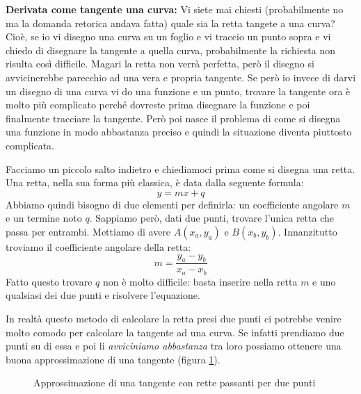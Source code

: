\textbf{Derivata come tangente una curva:} Vi siete mai chiesti (probabilmente no ma la domanda retorica andava fatta) quale sia la retta tangete a una curva? Cioè, se io vi disegno una curva su un foglio e vi traccio un punto sopra e vi chiedo di disegnare la tangente a quella curva, probabilmente la richiesta non risulta così difficile. Magari la retta non verrà perfetta, però il disegno si avvicinerebbe parecchio ad una vera e propria tangente. Se però io invece di darvi un disegno di una curva vi do una funzione e un punto, trovare la tangente ora è molto più complicato perché dovreste prima disegnare la funzione e poi finalmente tracciare la tangente. Però poi nasce il problema di come si disegna una funzione in modo abbastanza preciso e quindi la situazione diventa piuttosto complicata. 

Facciamo un piccolo salto indietro e chiediamoci prima come si disegna una retta. Una retta, nella sua forma più classica, è data dalla seguente formula:
\begin{equation*}
	y = mx + q
\end{equation*}
Abbiamo quindi bisogno di due elementi per definirla: un coefficiente angolare $m$ e un termine noto $q$. Sappiamo però, dati due punti, trovare l'unica retta che passa per entrambi. Mettiamo di avere $A(x_a, y_a)$ e $B(x_b, y_b)$. Innanzitutto troviamo il coefficiente angolare della retta:
\begin{equation*}
	m = \dfrac{y_a - y_b}{x_a - x_b}
\end{equation*}
Fatto questo trovare $q$ non è molto difficile: basta inserire nella retta $m$ e uno qualsiasi dei due punti e risolvere l'equazione.

In realtà questo metodo di calcolare la retta presi due punti ci potrebbe venire molto comodo per calcolare la tangente ad una curva. Se infatti prendiamo due punti su di essa e poi li \textit{avviciniamo abbastanza} tra loro possiamo ottenere una buona approssimazione di una tangente (figura \ref{ApproxTangenteCurva}).



\begin{figure}[h]
\centering
{}
  \caption{Approssimazione di una tangente con rette passanti per due punti} 
	\label{ApproxTangenteCurva}
\end{figure}

